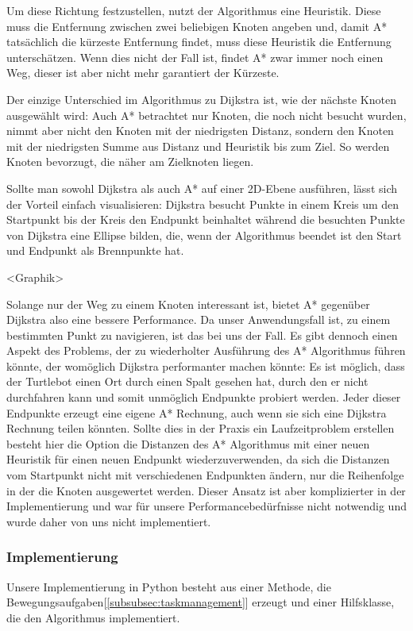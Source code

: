Um diese Richtung festzustellen, nutzt der Algorithmus eine Heuristik.
Diese muss die Entfernung zwischen zwei beliebigen Knoten angeben und, damit A* tatsächlich die kürzeste Entfernung
findet, muss diese Heuristik die Entfernung unterschätzen.
Wenn dies nicht der Fall ist, findet A* zwar immer noch einen Weg, dieser ist aber nicht mehr garantiert der Kürzeste.

Der einzige Unterschied im Algorithmus zu Dijkstra ist, wie der nächste Knoten ausgewählt wird: Auch A* betrachtet nur
Knoten, die noch nicht besucht wurden, nimmt aber nicht den Knoten mit der niedrigsten Distanz, sondern den Knoten mit der
niedrigsten Summe aus Distanz und Heuristik bis zum Ziel.
So werden Knoten bevorzugt, die näher am Zielknoten liegen.

Sollte man sowohl Dijkstra als auch A* auf einer 2D-Ebene ausführen, lässt sich der Vorteil einfach visualisieren:
Dijkstra besucht Punkte in einem Kreis um den Startpunkt bis der Kreis den Endpunkt beinhaltet während die besuchten Punkte
von Dijkstra eine Ellipse bilden, die, wenn der Algorithmus beendet ist den Start und Endpunkt als Brennpunkte hat.

<Graphik> %

Solange nur der Weg zu einem Knoten interessant ist, bietet A* gegenüber Dijkstra also eine bessere Performance.
Da unser Anwendungsfall ist, zu einem bestimmten Punkt zu navigieren, ist das bei uns der Fall.
Es gibt dennoch einen Aspekt des Problems, der zu wiederholter Ausführung des A* Algorithmus führen könnte, der womöglich
Dijkstra performanter machen könnte: Es ist möglich, dass der Turtlebot einen Ort durch einen Spalt gesehen hat, durch
den er nicht durchfahren kann und somit unmöglich Endpunkte probiert werden.
Jeder dieser Endpunkte erzeugt eine eigene A* Rechnung, auch wenn sie sich eine Dijkstra Rechnung teilen könnten.
Sollte dies in der Praxis ein Laufzeitproblem erstellen besteht hier die Option die Distanzen des A* Algorithmus mit
einer neuen Heuristik für einen neuen Endpunkt wiederzuverwenden, da sich die Distanzen vom Startpunkt nicht mit
verschiedenen Endpunkten ändern, nur die Reihenfolge in der die Knoten ausgewertet werden.
Dieser Ansatz ist aber komplizierter in der Implementierung und war für unsere Performancebedürfnisse nicht notwendig und
wurde daher von uns nicht implementiert.
\subsubsection{Implementierung}
Unsere Implementierung in Python besteht aus einer Methode, die Bewegungsaufgaben[\ref{subsubsec:taskmanagement}] erzeugt
und einer Hilfsklasse, die den Algorithmus implementiert.

